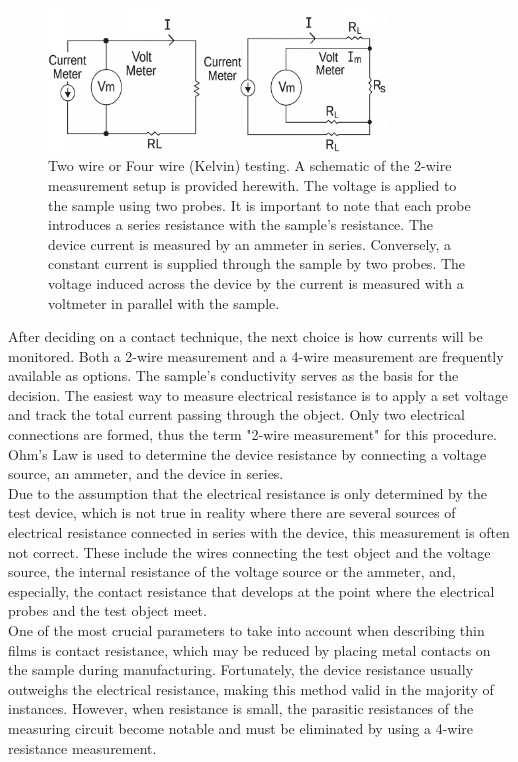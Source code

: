 \begin{figure}[htbp!] 
    \centering    
    \includegraphics[width=0.8\textwidth]{Chapter3/Figs/d.png}
    \caption[Two wire or Four wire (Kelvin) testing.]{Two wire or Four wire (Kelvin) testing. A schematic of the 2-wire measurement setup is provided herewith. The voltage is applied to the sample using two probes. It is important to note that each probe introduces a series resistance with the sample's resistance. The device current is measured by an ammeter in series. Conversely, a constant current is supplied through the sample by two probes. The voltage induced across the device by the current is measured with a voltmeter in parallel with the sample.}
    \label{fig:3d}
\end{figure}

\noindent After deciding on a contact technique, the next choice is how currents will be monitored. Both a 2-wire measurement and a 4-wire measurement are frequently available as options. The sample's conductivity serves as the basis for the decision. The easiest way to measure electrical resistance is to apply a set voltage and track the total current passing through the object. Only two electrical connections are formed, thus the term "2-wire measurement" for this procedure. Ohm's Law is used to determine the device resistance by connecting a voltage source, an ammeter, and the device in series. \\

\noindent Due to the assumption that the electrical resistance is only determined by the test device, which is not true in reality where there are several sources of electrical resistance connected in series with the device, this measurement is often not correct. These include the wires connecting the test object and the voltage source, the internal resistance of the voltage source or the ammeter, and, especially, the contact resistance that develops at the point where the electrical probes and the test object meet. \\

\noindent One of the most crucial parameters to take into account when describing thin films is contact resistance, which may be reduced by placing metal contacts on the sample during manufacturing. Fortunately, the device resistance usually outweighs the electrical resistance, making this method valid in the majority of instances. However, when resistance is small, the parasitic resistances of the measuring circuit become notable and must be eliminated by using a 4-wire resistance measurement. \\


